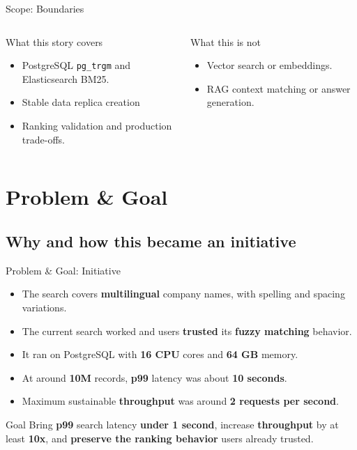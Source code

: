 \documentclass[aspectratio=169]{beamer}
\begin{document}
\begin{frame}{Scope: Boundaries}
  \footnotesize
  \begin{columns}[T,totalwidth=\textwidth]
      \begin{block}{What this story covers}
        \begin{itemize}
          \item PostgreSQL \texttt{pg\_trgm} and Elasticsearch BM25.
          \item Stable data replica creation
          \item Ranking validation and production trade-offs.
        \end{itemize}
      \end{block}

      \begin{alertblock}{What this is not}
        \begin{itemize}
          \item Vector search or embeddings.
          \item RAG context matching or answer generation.
        \end{itemize}
      \end{alertblock}
  \end{columns}

\end{frame}


\section{Problem \& Goal}
\subsection{Why and how this became an initiative}

\begin{frame}{Problem \& Goal: Initiative}
  \hypertarget{sec:problem}{}
  \begin{itemize}
    \item The search covers \textbf{multilingual} company names, with spelling and spacing variations.
    \item The current search worked and users \textbf{trusted} its \textbf{fuzzy matching} behavior.
    \item It ran on PostgreSQL with \textbf{16 CPU} cores and \textbf{64 GB} memory.
    \item At around \textbf{10M} records, \textbf{p99} latency was about \textbf{10 seconds}.
    \item Maximum sustainable \textbf{throughput} was around \textbf{2 requests per second}.
  \end{itemize}

  \vspace{0.5cm}
  \begin{block}{Goal}
    Bring \textbf{p99} search latency \textbf{under 1 second}, increase \textbf{throughput} by at least \textbf{10x}, and \textbf{preserve the ranking behavior} users already trusted.
  \end{block}
\end{frame}
\end{document}
